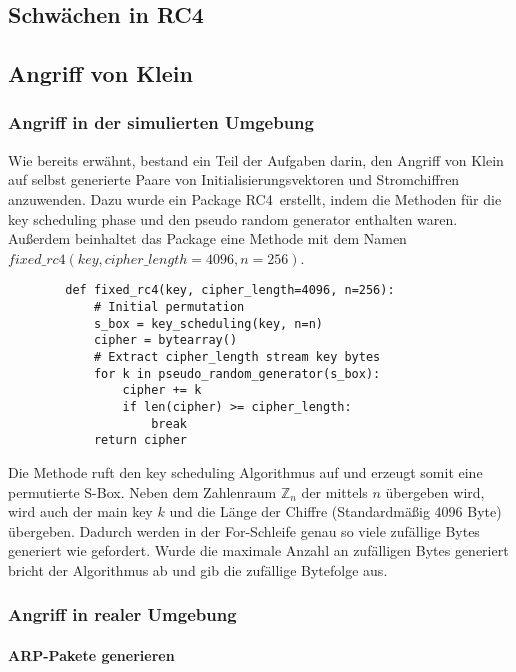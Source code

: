 \documentclass[10pt,a4paper]{article}
\begin{document}
\subsection{Schwächen in RC4}

\subsection{Angriff von Klein}

\subsubsection{Angriff in der simulierten Umgebung}
Wie bereits erwähnt, bestand ein Teil der Aufgaben darin, den Angriff von Klein auf selbst generierte Paare von Initialisierungsvektoren und Stromchiffren anzuwenden. Dazu wurde ein Package \grqq RC4\grqq\ erstellt, indem die Methoden für die key scheduling phase und den pseudo random generator enthalten waren. Außerdem beinhaltet das Package eine Methode mit dem Namen $fixed\_rc4(key, cipher\_length=4096, n=256)$.
\begin{lstlisting}
		def fixed_rc4(key, cipher_length=4096, n=256):
    		# Initial permutation
    		s_box = key_scheduling(key, n=n)
    		cipher = bytearray()
    		# Extract cipher_length stream key bytes
    		for k in pseudo_random_generator(s_box):
        		cipher += k
        		if len(cipher) >= cipher_length:
            		break
    		return cipher
\end{lstlisting}
Die Methode ruft den key scheduling Algorithmus auf und erzeugt somit eine permutierte S-Box. Neben dem Zahlenraum $\mathbb{Z}_n$ der mittels $n$ übergeben wird, wird auch der main key $k$ und die Länge der Chiffre (Standardmäßig 4096 Byte) übergeben. Dadurch werden in der For-Schleife genau so viele zufällige Bytes generiert wie gefordert. Wurde die maximale Anzahl an zufälligen Bytes generiert bricht der Algorithmus ab und gib die zufällige Bytefolge aus.
\subsubsection{Angriff in realer Umgebung}
\paragraph{ARP-Pakete generieren}
\end{document}
